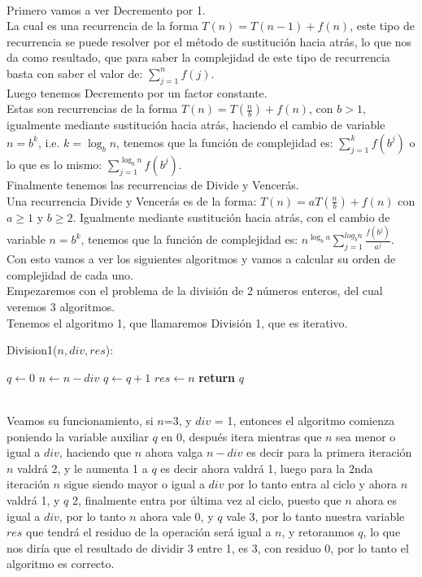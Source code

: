 \documentclass[12pt,twoside]{article}
\begin{document}
\\ Primero vamos a ver Decremento por 1.
\\ La cual es una recurrencia de la forma $T(n)=T(n-1)+f(n)$, este tipo de recurrencia se puede resolver por el método de sustitución hacia atrás, lo que nos da como resultado, que para saber la complejidad de este tipo de recurrencia basta con saber el valor de: $\sum_{j=1}^{n} f(j)$.
\newline
\\ Luego tenemos Decremento por un factor constante.
\\ Estas son recurrencias de la forma $T(n)=T(\frac{n}{b})+f(n)$, con $b>1$, igualmente mediante sustitución hacia atrás, haciendo el cambio de variable $n=b^k$, i.e. $k=\log_bn$, tenemos que la función de complejidad es:  $\sum_{j=1}^{k} f(b^j)$ o lo que es lo mismo:  $\sum_{j=1}^{\log_bn} f(b^j)$.
\newline
\\ Finalmente tenemos las recurrencias de Divide y Vencerás.
\\ Una recurrencia Divide y Vencerás es de la forma: $T(n)=aT(\frac{n}{b})+f(n)$ con $a\geq 1$ y $b\geq 2$. Igualmente mediante sustitución hacia atrás, con el cambio de variable $n=b^k$, tenemos que la función de complejidad es: $n^{\log_ba}\sum_{j=1}^{log_bn} \frac{f(b^j)}{a^j}$.
\newpage
Con esto vamos a ver los siguientes algoritmos y vamos a calcular su orden de complejidad de cada uno.
\\ Empezaremos con el problema de la división de 2 números enteros, del cual veremos 3 algoritmos.
\newline
\\ Tenemos el algoritmo 1, que llamaremos División 1, que es iterativo.
\begin{algorithm}
    \caption{Division1($n,div,res$):}
    \begin{algorithmic}
        \State $q \gets 0$
            \State $n \gets n-div$
            \State $q \gets q+1$
        \EndWhile
        \State $res \gets n$
        \State \textbf{return} $q$
    \end{algorithmic}
\end{algorithm}
\\ Veamos su funcionamiento, si $n$=3, y $div$ = 1, entonces el algoritmo comienza poniendo la variable auxiliar $q$ en 0, después itera mientras que $n$ sea menor o igual a $div$, haciendo que $n$ ahora valga $n-div$ es decir para la primera iteración $n$ valdrá 2, y le aumenta 1 a $q$ es decir ahora valdrá 1, luego para la 2nda iteración $n$ sigue siendo mayor o igual a $div$ por lo tanto entra al ciclo y ahora $n$ valdrá 1, y $q$ 2, finalmente entra por última vez al ciclo, puesto que $n$ ahora es igual a $div$, por lo tanto $n$ ahora vale 0, y $q$ vale 3, por lo tanto nuestra variable $res$ que tendrá el residuo de la operación será igual a $n$, y retoranmos $q$, lo que nos diría que el resultado de dividir 3 entre 1, es 3, con residuo 0, por lo tanto el algoritmo es correcto.
\end{document}
